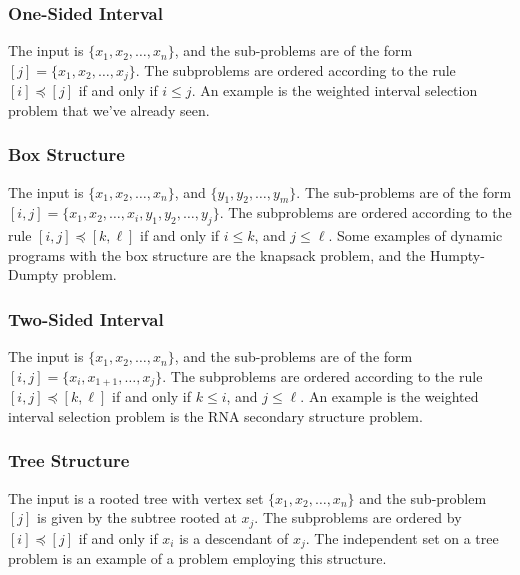 \documentclass{article}
\begin{document}
\subsubsection{One-Sided Interval}
The input is $\{x_1, x_2, \dots, x_n\}$, and the sub-problems are of the form $[j] = \{x_1, x_2, \dots, x_j\}$. The subproblems are ordered according to the rule $[i] \preceq [j]$ if and only if $i \leq j$. An example is the weighted interval selection problem that we've already seen.
\subsubsection{Box Structure}
The input is $\{x_1, x_2, \dots, x_n\}$, and $\{y_1, y_2, \dots, y_m\}$. The sub-problems are of the form $[i, j] = \{x_1, x_2, \dots, x_i, y_1, y_2, \dots, y_j\}$. The subproblems are ordered according to the rule $[i, j] \preceq [k, \ell]$ if and only if $i \leq k$, and $j \leq \ell$. Some examples of dynamic programs with the box structure are the knapsack problem, and the Humpty-Dumpty problem.
\subsubsection{Two-Sided Interval}
The input is $\{x_1, x_2, \dots, x_n\}$, and the sub-problems are of the form $[i, j] = \{x_i, x_{1+1}, \dots, x_j\}$. The subproblems are ordered according to the rule $[i, j] \preceq [k, \ell]$ if and only if $k \leq i$, and $j \leq \ell$. An example is the weighted interval selection problem is the RNA secondary structure problem.
\subsubsection{Tree Structure}
The input is a rooted tree with vertex set $\{x_1, x_2, \dots, x_n\}$ and the sub-problem $[j]$ is given by the subtree rooted at $x_j$. The subproblems are ordered by $[i] \preceq [j]$ if and only if $x_i$ is a descendant of $x_j$. The independent set on a tree problem is an example of a problem employing this structure.
\end{document}
